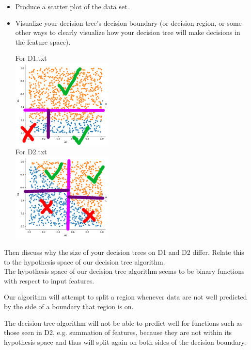 \documentclass[a4paper]{article}
\theoremstyle{definition}
\begin{document}
\begin{enumerate}
\begin{itemize}
  \item Produce a scatter plot of the data set.

  \item Visualize your decision tree's decision boundary (or decision region, or some other ways to clearly visualize how your decision tree will make decisions in the feature space).

  For D1.txt\\
  \includegraphics[width=0.4\textwidth]{hw2/2_6_1_boundary.png}\\

  For D2.txt\\
  \includegraphics[width=0.4\textwidth]{hw2/2_6_2_boundary.png}\\

  \end{itemize}
Then discuss why the size of your decision trees on D1 and D2 differ.  Relate this to the hypothesis space of our decision tree algorithm. \\

    The hypothesis space of our decision tree algorithm seems to be binary functions with respect to input features.

    Our algorithm will attempt to split a region whenever data are not well predicted by the side of a boundary that region is on.

    The decision tree algorithm will not be able to predict well for functions such as those seen in D2, e.g. summation of features, because they are not within its hypothesis space and thus will split again on both sides of the decision boundary.


\end{enumerate}
\end{document}
